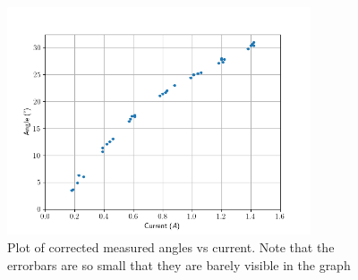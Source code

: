 \begin{figure}[H]
	\centering
	\includegraphics[width=0.8\textwidth]{figures/rawplot.png}
	\caption{Plot of corrected measured angles vs current. Note that the errorbars are so small that they are barely visible in the graph}
	\label{fig:rawplot}
\end{figure}
